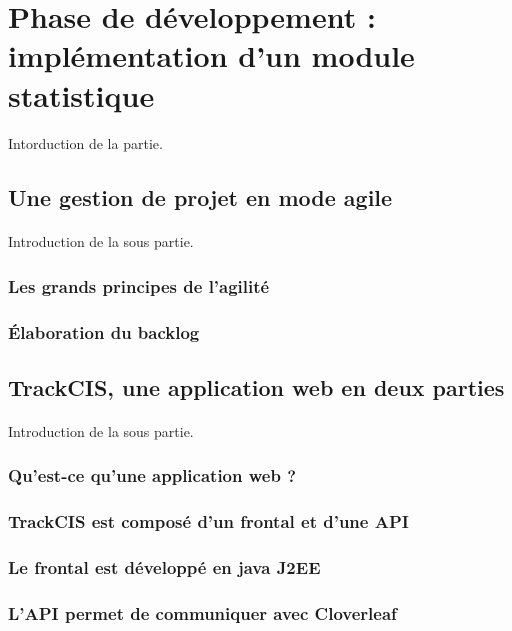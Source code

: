 \section{Phase de développement : implémentation d'un module statistique}
	\paragraph{}
	Intorduction de la partie.
	
	\subsection{Une gestion de projet en mode agile}
		\paragraph{}
		Introduction de la sous partie.
		 
		\subsubsection{Les grands principes de l'agilité}
		\subsubsection{Élaboration du backlog}
	
	\subsection{TrackCIS, une application web en deux parties}
		\paragraph{} 
		Introduction de la sous partie.
		 
		\subsubsection{Qu'est-ce qu'une application web ?}
		\subsubsection{TrackCIS est composé d'un frontal et d'une API}
		\subsubsection{Le frontal est développé en java J2EE}
		\subsubsection{L'API permet de communiquer avec Cloverleaf}
	
